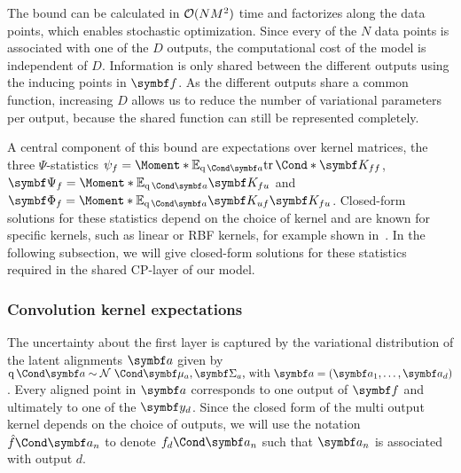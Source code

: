 The bound can be calculated in $\operatorname{\mathcal{O}}(NM^2)$ time and factorizes along the data points, which enables stochastic optimization.
Since every of the $N$ data points is associated with one of the $D$ outputs, the computational cost of the model is independent of $D$.
Information is only shared between the different outputs using the inducing points in $\mat{f}$.
As the different outputs share a common function, increasing $D$ allows us to reduce the number of variational parameters per output, because the shared function can still be represented completely.

A central component of this bound are expectations over kernel matrices, the three $\Psi$-statistics $\psi_f = \Moment*{\E_{\Variat{\rv{a}}}}{\Fun*{\tr}{\mat{K_{ff}}}}$, $\mat{\Psi_f} = \Moment*{\E_{\Variat{\rv{a}}}}{\mat{K_{fu}}}$ and $\mat{\Phi_f} = \Moment*{\E_{\Variat{\rv{a}}}}{\mat{K_{uf}}\mat{K_{fu}}}$.
Closed-form solutions for these statistics depend on the choice of kernel and are known for specific kernels, such as linear or RBF kernels, for example shown in~\parencite{damianou_deep_2013}.
In the following subsection, we will give closed-form solutions for these statistics required in the shared CP-layer of our model.

\subsubsection{Convolution kernel expectations}
The uncertainty about the first layer is captured by the variational distribution of the latent alignments $\rv{a}$ given by $\Variat{\rv{a}} \sim \Gaussian{\mat{\mu}_a, \mat{\Sigma}_a}\text{, with } \rv{a} = \left( \rv{a}_1, \dots, \rv{a}_d \right)$.
Every aligned point in $\rv{a}$ corresponds to one output of $\rv{f}$ and ultimately to one of the $\rv{y}_d$.
Since the closed form of the multi output kernel depends on the choice of outputs, we will use the notation $\Fun{\hat{f}}{\rv{a}_n}$ to denote $\Fun{f_d}{\rv{a}_n}$ such that $\rv{a}_n$ is associated with output $d$.

